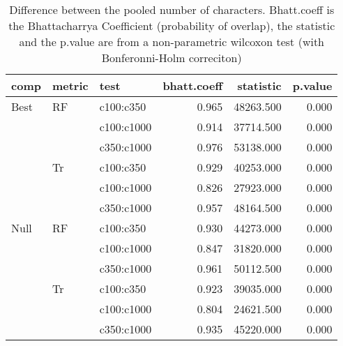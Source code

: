 \begin{table}[ht]
\centering
\begin{tabular}{lllrrr}
  \hline
comp & metric & test & bhatt.coeff & statistic & p.value \\ 
  \hline
Best & RF & c100:c350 & 0.965 & 48263.500 & 0.000 \\ 
   &  & c100:c1000 & 0.914 & 37714.500 & 0.000 \\ 
   &  & c350:c1000 & 0.976 & 53138.000 & 0.000 \\ 
   & Tr & c100:c350 & 0.929 & 40253.000 & 0.000 \\ 
   &  & c100:c1000 & 0.826 & 27923.000 & 0.000 \\ 
   &  & c350:c1000 & 0.957 & 48164.500 & 0.000 \\ 
  Null & RF & c100:c350 & 0.930 & 44273.000 & 0.000 \\ 
   &  & c100:c1000 & 0.847 & 31820.000 & 0.000 \\ 
   &  & c350:c1000 & 0.961 & 50112.500 & 0.000 \\ 
   & Tr & c100:c350 & 0.923 & 39035.000 & 0.000 \\ 
   &  & c100:c1000 & 0.804 & 24621.500 & 0.000 \\ 
   &  & c350:c1000 & 0.935 & 45220.000 & 0.000 \\ 
   \hline
\end{tabular}
\caption{Difference between the pooled number of characters. Bhatt.coeff is the Bhattacharrya Coefficient (probability of overlap), the statistic and the p.value are from a non-parametric wilcoxon test (with Bonferonni-Holm correciton)} 
\label{Full_Tab_pooledscharacters_test}
\end{table}
